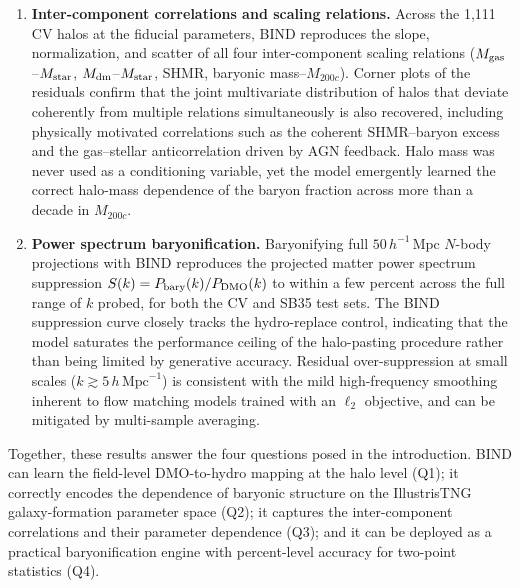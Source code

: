 \documentclass[linenumbers,trackchanges, twocolumn]{aastex701}
\begin{document}
\begin{enumerate}
    \item \textbf{Inter-component correlations and scaling relations.}
    Across the 1{,}111 CV halos at the fiducial parameters, \textsc{BIND} reproduces the slope, normalization, and scatter of all four inter-component scaling relations ($M_{\rm gas}$--$M_{\rm star}$, $M_{\rm dm}$--$M_{\rm star}$, SHMR, baryonic mass--$M_{200c}$). Corner plots of the residuals confirm that the joint multivariate distribution of halos that deviate coherently from multiple relations simultaneously is also recovered, including physically motivated correlations such as the coherent SHMR--baryon excess and the gas--stellar anticorrelation driven by AGN feedback. Halo mass was never used as a conditioning variable, yet the model emergently learned the correct halo-mass dependence of the baryon fraction across more than a decade in $M_{200c}$.

    \item \textbf{Power spectrum baryonification.}
    Baryonifying full $50\,h^{-1}\,\mathrm{Mpc}$ $N$-body projections with \textsc{BIND} reproduces the projected matter power spectrum suppression $S(k) = P_{\rm bary}(k)/P_{\rm DMO}(k)$ to within a few percent across the full range of $k$ probed, for both the CV and SB35 test sets. The \textsc{BIND} suppression curve closely tracks the hydro-replace control, indicating that the model saturates the performance ceiling of the halo-pasting procedure rather than being limited by generative accuracy. Residual over-suppression at small scales ($k \gtrsim 5\,h\,\mathrm{Mpc}^{-1}$) is consistent with the mild high-frequency smoothing inherent to flow matching models trained with an $\ell_2$ objective, and can be mitigated by multi-sample averaging.

\end{enumerate}

Together, these results answer the four questions posed in the introduction. \textsc{BIND} can learn the field-level DMO-to-hydro mapping at the halo level (Q1); it correctly encodes the dependence of baryonic structure on the IllustrisTNG galaxy-formation parameter space (Q2); it captures the inter-component correlations and their parameter dependence (Q3); and it can be deployed as a practical baryonification engine with percent-level accuracy for two-point statistics (Q4).
\end{document}
